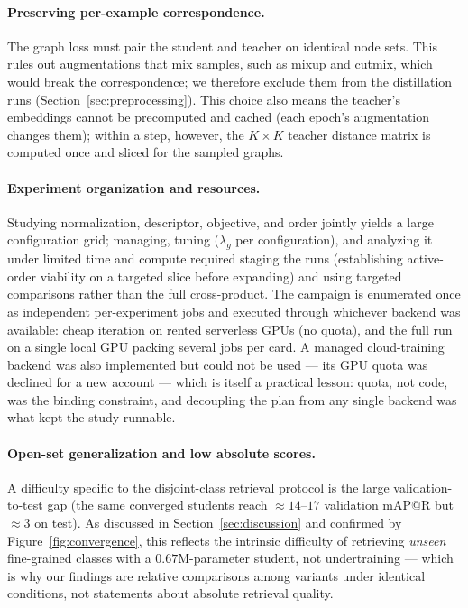 \documentclass[11pt,letterpaper]{article}
\begin{document}
\paragraph{Preserving per-example correspondence.} The graph loss must pair the student
and teacher on identical node sets. This rules out augmentations that mix samples, such
as mixup and cutmix, which would break the correspondence; we therefore exclude them
from the distillation runs (Section~\ref{sec:preprocessing}). This choice also means the
teacher's embeddings cannot be precomputed and cached (each epoch's augmentation changes
them); within a step, however, the $K \times K$ teacher distance matrix is computed once
and sliced for the sampled graphs.

\paragraph{Experiment organization and resources.} Studying normalization, descriptor,
objective, and order jointly yields a large configuration grid; managing, tuning
($\lambda_g$ per configuration), and analyzing it under limited time and compute
required staging the runs (establishing active-order viability on a targeted slice
before expanding) and using targeted comparisons rather than the full cross-product.
The campaign is enumerated once as independent per-experiment jobs and executed through
whichever backend was available: cheap iteration on rented serverless GPUs (no quota),
and the full run on a single local GPU packing several jobs per card. A managed
cloud-training backend was also implemented but could not be used --- its GPU quota was
declined for a new account --- which is itself a practical lesson: quota, not code, was
the binding constraint, and decoupling the plan from any single backend was what kept
the study runnable.
\paragraph{Open-set generalization and low absolute scores.} A difficulty specific to
the disjoint-class retrieval protocol is the large validation-to-test gap (the same
converged students reach $\approx 14$--$17$ validation mAP@R but $\approx 3$ on test). As
discussed in Section~\ref{sec:discussion} and confirmed by Figure~\ref{fig:convergence},
this reflects the intrinsic difficulty of retrieving \emph{unseen} fine-grained classes
with a $0.67$M-parameter student, not undertraining --- which is why our findings are
relative comparisons among variants under identical conditions, not statements about
absolute retrieval quality.
\end{document}
